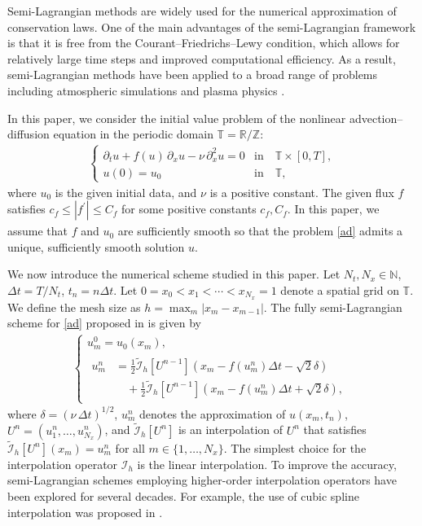 \documentclass[10pt,a4paper,tbtags,leqno]{amsart}
\theoremstyle{definition}
\numberwithin{equation}{section}
\def\snorm#1#2{\left|#2\right|_{#1}}
\begin{document}
Semi-Lagrangian methods are widely used for the numerical approximation of conservation laws. One of the main advantages of the semi-Lagrangian framework is that it is free from the Courant--Friedrichs--Lewy condition, which allows for relatively large time steps and improved computational efficiency. As a result, semi-Lagrangian methods have been applied to a broad range of problems including atmospheric simulations \cite{91StCo} and plasma physics \cite{99SoRoBeGh}. 

In this paper, we consider the initial value problem of the nonlinear advection--diffusion equation in the periodic domain $ \mathbb{T} = \mathbb{R} / \mathbb{Z} $: 
\begin{align} \label{ad}
  \begin{cases} 
    \partial_t u + f(u) \, \partial_x u - \nu \, \partial_x^2 u = 0 & \text{in} \quad \mathbb{T} \times [0, T], \\
    u (0) = u_0 & \text{in} \quad \mathbb{T}, 
  \end{cases} 
\end{align} 
where $ u_0 $ is the given initial data, and $ \nu $ is a positive constant. The given flux $ f $ satisfies $ c_{f} \leq \snorm{}{f^\prime} \leq C_{f} $ for some positive constants $ c_{f}, C_{f} $. In this paper, we assume that $ f $ and $ u_0 $ are sufficiently smooth so that the problem \eqref{ad} admits a unique, sufficiently smooth solution $ u $. 

We now introduce the numerical scheme studied in this paper. Let $ N_t, N_x \in \mathbb{N} $, $ \Delta t = T / N_t $, $ t_n = n \Delta t $. Let $ 0 = x_0 < x_1 < \cdots < x_{N_x} = 1 $ denote a spatial grid on $ \mathbb{T} $. We define the mesh size as $ h = \max_{m} |x_{m} - x_{m-1}| $. The fully semi-Lagrangian scheme for \eqref{ad} proposed in \cite{25Fe} is given by 
\begin{gather} 
  \label{dSL-V} 
  \begin{cases} 
    u_m^0 = u_0 (x_m), \\ 
    \begin{aligned}
    u_m^{n} & = \frac{1}{2} \tilde{\mathcal{I}}_h [U^{n - 1}] \left( x_m - f (u_m^n) \Delta t - \sqrt{2} \delta \right) \\ 
    & \quad + \frac{1}{2} \tilde{\mathcal{I}}_h [U^{n - 1}] \left( x_m - f (u_m^n) \Delta t + \sqrt{2} \delta \right),   
    \end{aligned}
  \end{cases} 
\end{gather} 
where $ \delta = (\nu \, \Delta t)^{1/2} $, $ u_m^n $ denotes the approximation of $ u (x_m, t_n) $, $ U^n = (u_1^n, \ldots, u_{N_x}^n) $, and $ \tilde{\mathcal{I}}_{h} [U^n] $ is an interpolation of $ U^n $ that satisfies $ \tilde{\mathcal{I}}_{h} [U^n] (x_m) = u_m^n $ for all $ m \in \{1, \ldots, N_x\} $. The simplest choice for the interpolation operator $\mathcal{I}_h$ is the linear interpolation. To improve the accuracy, semi-Lagrangian schemes employing higher-order interpolation operators have been explored for several decades. For example, the use of cubic spline interpolation was proposed in \cite{76Pu}. 
\end{document}
